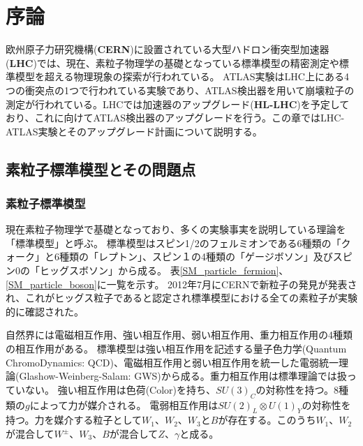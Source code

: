 \chapter{序論}
欧州原子力研究機構(\textbf{CERN})に設置されている大型ハドロン衝突型加速器(\textbf{LHC})では、現在、素粒子物理学の基礎となっている標準模型の精密測定や標準模型を超える物理現象の探索が行われている。
ATLAS実験はLHC上にある4つの衝突点の1つで行われている実験であり、ATLAS検出器を用いて崩壊粒子の測定が行われている。LHCでは加速器のアップグレード(\textbf{HL-LHC})を予定しており、これに向けてATLAS検出器のアップグレードを行う。この章ではLHC-ATLAS実験とそのアップグレード計画について説明する。

\section{素粒子標準模型とその問題点}
\subsection{素粒子標準模型}
現在素粒子物理学で基礎となっており、多くの実験事実を説明している理論を「標準模型」\cite{1-9}と呼ぶ。
標準模型はスピン1/2のフェルミオンである6種類の「クォーク」と6種類の「レプトン」、スピン１の4種類の「ゲージボソン」及びスピン0の「ヒッグスボソン」から成る。
表\ref{SM_particle_fermion}、\ref{SM_particle_boson}に一覧を示す。
2012年7月にCERNで新粒子の発見が発表され、これがヒッグス粒子であると認定され標準模型における全ての素粒子が実験的に確認された。

自然界には電磁相互作用、強い相互作用、弱い相互作用、重力相互作用の4種類の相互作用がある。
標準模型は強い相互作用を記述する量子色力学(Quantum ChromoDynamics: QCD)、電磁相互作用と弱い相互作用を統一した電弱統一理論(Glashow-Weinberg-Salam: GWS)から成る。重力相互作用は標準理論では扱っていない。
強い相互作用は色荷(Color)を持ち、$SU(3)_C$の対称性を持つ。8種類の$g$によって力が媒介される。
電弱相互作用は$SU(2)_L \otimes U(1)_Y$の対称性を持つ。力を媒介する粒子として$W_1、W_2、W_3$と$B$が存在する。このうち$W_1、W_2$が混合して$W^{\pm}、W_3、B$が混合して$Z、\gamma$と成る。

